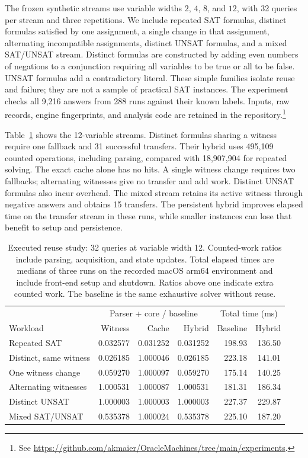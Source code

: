 \documentclass[11pt,a4paper]{article}
\numberwithin{equation}{section}
\theoremstyle{plain}
\theoremstyle{definition}
\theoremstyle{remark}
\begin{document}
The frozen synthetic streams use variable widths $2$, $4$, $8$, and $12$, with 32 queries per stream and three repetitions. We include repeated SAT formulas, distinct formulas satisfied by one assignment, a single change in that assignment, alternating incompatible assignments, distinct UNSAT formulas, and a mixed SAT/UNSAT stream. Distinct formulas are constructed by adding even numbers of negations to a conjunction requiring all variables to be true or all to be false. UNSAT formulas add a contradictory literal. These simple families isolate reuse and failure; they are not a sample of practical SAT instances. The experiment checks all 9,216 answers from 288 runs against their known labels. Inputs, raw records, engine fingerprints, and analysis code are retained in the repository.\footnote{See \url{https://github.com/akmaier/OracleMachines/tree/main/experiments}.}

Table~\ref{tab:mechanism-results} shows the 12-variable streams. Distinct formulas sharing a witness require one fallback and 31 successful transfers. Their hybrid uses 495,109 counted operations, including parsing, compared with 18,907,904 for repeated solving. The exact cache alone has no hits. A single witness change requires two fallbacks; alternating witnesses give no transfer and add work. Distinct UNSAT formulas also incur overhead. The mixed stream retains its active witness through negative answers and obtains 15 transfers. The persistent hybrid improves elapsed time on the transfer stream in these runs, while smaller instances can lose that benefit to setup and persistence.

\begin{table}[htbp]
\centering
\small
\setlength{\tabcolsep}{4pt}
\begin{tabular}{lrrrrr}
\hline
& \multicolumn{3}{c}{Parser + core / baseline} & \multicolumn{2}{c}{Total time (ms)} \\
Workload & Witness & Cache & Hybrid & Baseline & Hybrid \\
\hline
Repeated SAT & 0.032577 & 0.031252 & 0.031252 & 198.93 & 136.50 \\
Distinct, same witness & 0.026185 & 1.000046 & 0.026185 & 223.18 & 141.01 \\
One witness change & 0.059270 & 1.000097 & 0.059270 & 175.14 & 140.25 \\
Alternating witnesses & 1.000531 & 1.000087 & 1.000531 & 181.31 & 186.34 \\
Distinct UNSAT & 1.000003 & 1.000003 & 1.000003 & 227.37 & 229.87 \\
Mixed SAT/UNSAT & 0.535378 & 1.000024 & 0.535378 & 225.10 & 187.20 \\
\hline
\end{tabular}
\caption{Executed reuse study: 32 queries at variable width 12. Counted-work ratios include parsing, acquisition, and state updates. Total elapsed times are medians of three runs on the recorded macOS arm64 environment and include front-end setup and shutdown. Ratios above one indicate extra counted work. The baseline is the same exhaustive solver without reuse.}
\label{tab:mechanism-results}
\end{table}
\end{document}
